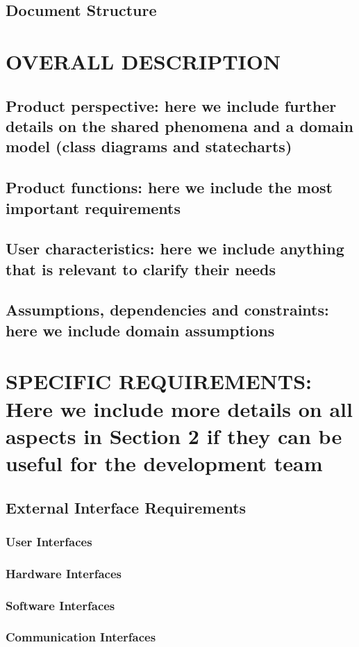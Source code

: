 \documentclass[12pt,a4paper]{article}
\begin{document}
\subsection{Document Structure} 
\section{OVERALL DESCRIPTION}
\subsection{Product perspective: here we include  further details on  the  shared phenomena and a 
domain model (class diagrams and statecharts)} 
\subsection{Product functions: here we include the most important requirements} 
\subsection{User characteristics: here we include anything that is relevant to clarify their needs} 
\subsection{Assumptions, dependencies and constraints: here we include domain assumptions } 
\section{SPECIFIC REQUIREMENTS: Here we include more details on all aspects in Section 2 if they 
can be useful for the development team}
\subsection{External Interface Requirements} 
\subsubsection{User Interfaces}
\subsubsection{Hardware Interfaces}
\subsubsection{Software Interfaces}
\subsubsection{Communication Interfaces}
\end{document}
